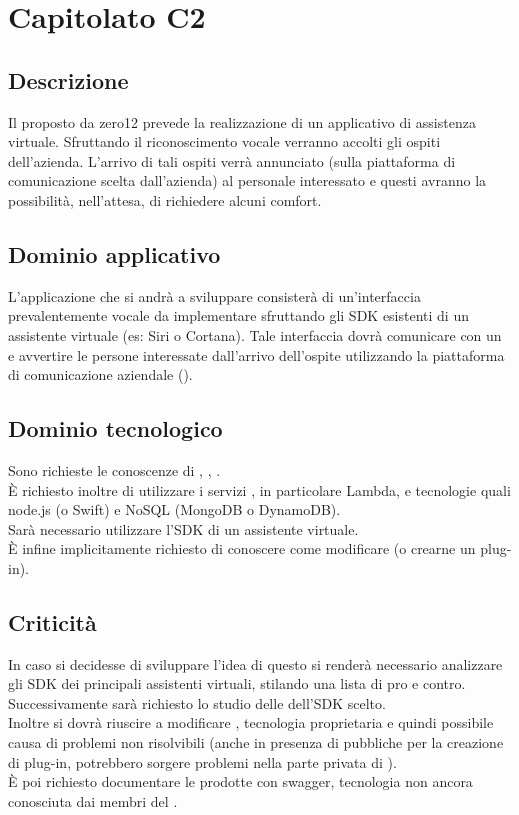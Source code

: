 
\section {Capitolato C2}


\subsection {Descrizione}
Il  proposto da zero12 prevede la realizzazione di un applicativo di assistenza virtuale. Sfruttando il riconoscimento vocale verranno accolti gli ospiti dell’azienda. L’arrivo di tali ospiti verrà annunciato (sulla piattaforma di comunicazione scelta dall’azienda) al personale interessato e questi avranno la possibilità, nell’attesa, di richiedere alcuni comfort.


\subsection {Dominio applicativo}
L’applicazione che si andrà a sviluppare consisterà di un’interfaccia prevalentemente vocale da implementare sfruttando gli SDK esistenti di un assistente virtuale (es: Siri o Cortana). Tale interfaccia dovrà comunicare con un  e avvertire le persone interessate dall’arrivo dell'ospite utilizzando la piattaforma di comunicazione aziendale ().


\subsection {Dominio tecnologico}
Sono richieste le conoscenze di , , . \\
È richiesto inoltre di utilizzare i servizi , in particolare  Lambda, e tecnologie quali node.js (o Swift) e  NoSQL (MongoDB o DynamoDB). \\
Sarà necessario utilizzare l'SDK di un assistente virtuale. \\
È infine implicitamente richiesto di conoscere come modificare  (o crearne un plug-in).


\subsection {Criticità}
In caso si decidesse di sviluppare l’idea di questo  si renderà necessario analizzare gli SDK dei principali assistenti virtuali, stilando una lista di pro e contro. Successivamente sarà richiesto lo studio delle  dell’SDK scelto. \\
Inoltre si dovrà riuscire a modificare , tecnologia proprietaria e quindi possibile causa di problemi non risolvibili (anche in presenza di  pubbliche per la creazione di plug-in, potrebbero sorgere problemi nella parte privata di ). \\
È poi richiesto documentare le  prodotte con swagger, tecnologia non ancora conosciuta dai membri del .


